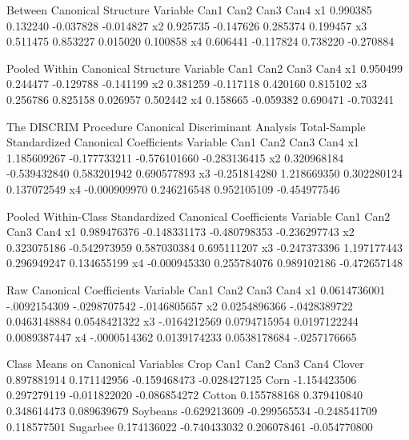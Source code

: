 \documentclass{article}
\begin{document}
\begin{Woutput}
                          Between Canonical Structure
Variable              Can1              Can2              Can3              Can4
x1                0.990385          0.132240         -0.037828         -0.014827
x2                0.925735         -0.147626          0.285374          0.199457
x3                0.511475          0.853227          0.015020          0.100858
x4                0.606441         -0.117824          0.738220         -0.270884

                       Pooled Within Canonical Structure
Variable              Can1              Can2              Can3              Can4
x1                0.950499          0.244477         -0.129788         -0.141199
x2                0.381259         -0.117118          0.420160          0.815102
x3                0.256786          0.825158          0.026957          0.502442
x4                0.158665         -0.059382          0.690471         -0.703241

The DISCRIM Procedure
Canonical Discriminant Analysis
                Total-Sample Standardized Canonical Coefficients
Variable              Can1              Can2              Can3              Can4
x1             1.185609267      -0.177733211      -0.576101660      -0.283136415
x2             0.320968184      -0.539432840       0.583201942       0.690577893
x3            -0.251814280       1.218669350       0.302280124       0.137072549
x4            -0.000909970       0.246216548       0.952105109      -0.454977546

            Pooled Within-Class Standardized Canonical Coefficients
Variable              Can1              Can2              Can3              Can4
x1             0.989476376      -0.148331173      -0.480798353      -0.236297743
x2             0.323075186      -0.542973959       0.587030384       0.695111207
x3            -0.247373396       1.197177443       0.296949247       0.134655199
x4            -0.000945330       0.255784076       0.989102186      -0.472657148

                           Raw Canonical Coefficients
Variable              Can1              Can2              Can3              Can4
x1            0.0614736001      -.0092154309      -.0298707542      -.0146805657
x2            0.0254896366      -.0428389722      0.0463148884      0.0548421322
x3            -.0164212569      0.0794715954      0.0197122244      0.0089387447
x4            -.0000514362      0.0139174233      0.0538178684      -.0257176665

                       Class Means on Canonical Variables
Crop                  Can1              Can2              Can3              Can4
Clover         0.897881914       0.171142956      -0.159468473      -0.028427125
Corn          -1.154423506       0.297279119      -0.011822020      -0.086854272
Cotton         0.155788168       0.379410840       0.348614473       0.089639679
Soybeans      -0.629213609      -0.299565534      -0.248541709       0.118577501
Sugarbee       0.174136022      -0.740433032       0.206078461      -0.054770800


\end{Woutput}
\end{document}

